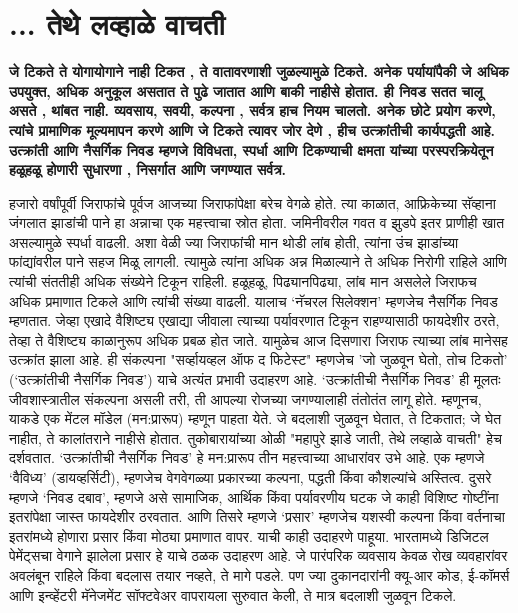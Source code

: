 \chapter{... तेथे लव्हाळे वाचती}

\textcolor{blue!60!black}{\textbf{जे टिकते ते योगायोगाने नाही टिकत , ते वातावरणाशी जुळल्यामुळे टिकते. अनेक पर्यायांपैकी जे अधिक उपयुक्त, अधिक अनुकूल असतात ते पुढे जातात आणि बाकी नाहीसे होतात. ही निवड सतत चालू असते , थांबत नाही. व्यवसाय, सवयी, कल्पना , सर्वत्र हाच नियम चालतो. अनेक छोटे प्रयोग करणे, त्यांचे प्रामाणिक मूल्यमापन करणे आणि जे टिकते त्यावर जोर देणे , हीच उत्क्रांतीची कार्यपद्धती आहे. उत्क्रांती आणि नैसर्गिक निवड म्हणजे विविधता, स्पर्धा आणि टिकण्याची क्षमता यांच्या परस्परक्रियेतून हळूहळू होणारी सुधारणा , निसर्गात आणि जगण्यात सर्वत्र.}}

हजारो वर्षांपूर्वी जिराफांचे पूर्वज आजच्या जिराफांपेक्षा बरेच वेगळे होते. त्या काळात, आफ्रिकेच्या सॅव्हाना जंगलात झाडांची पाने हा अन्नाचा एक महत्त्वाचा स्रोत होता. जमिनीवरील गवत व झुडपे इतर प्राणीही खात असल्यामुळे स्पर्धा वाढली. अशा वेळी ज्या जिराफांची मान थोडी लांब होती, त्यांना उंच झाडांच्या फांद्यांवरील पाने सहज मिळू लागली. त्यामुळे त्यांना अधिक अन्न मिळाल्याने ते अधिक निरोगी राहिले आणि त्यांची संततीही अधिक संख्येने टिकून राहिली. हळूहळू, पिढ्यानपिढ्या, लांब मान असलेले जिराफच अधिक प्रमाणात टिकले आणि त्यांची संख्या वाढली. यालाच ‘नॅचरल सिलेक्शन’ म्हणजेच नैसर्गिक निवड म्हणतात. जेव्हा एखादे वैशिष्ट्य एखाद्या जीवाला त्याच्या पर्यावरणात टिकून राहण्यासाठी फायदेशीर ठरते, तेव्हा ते वैशिष्ट्य काळानुरूप अधिक प्रबळ होत जाते. यामुळेच आज दिसणारा जिराफ त्याच्या लांब मानेसह उत्क्रांत झाला आहे. ही संकल्पना "सर्व्हायव्हल ऑफ द फिटेस्ट" म्हणजेच 'जो जुळवून घेतो, तोच टिकतो' (‘उत्क्रांतीची नैसर्गिक निवड’) याचे अत्यंत प्रभावी उदाहरण आहे.
‘उत्क्रांतीची नैसर्गिक निवड’ ही मूलतः जीवशास्त्रातील संकल्पना असली तरी, ती आपल्या रोजच्या जगण्यालाही तंतोतंत लागू होते. म्हणूनच, याकडे एक मेंटल मॉडेल (मन:प्रारूप) म्हणून पाहता येते. जे बदलाशी जुळवून घेतात, ते टिकतात; जे घेत नाहीत, ते कालांतराने नाहीसे होतात. तुकोबारायांच्या ओळी "महापुरे झाडे जाती, तेथे लव्हाळे वाचती" हेच दर्शवतात. ‘उत्क्रांतीची  नैसर्गिक निवड’ हे मन:प्रारूप तीन महत्त्वाच्या आधारांवर उभे आहे. एक म्हणजे ‘वैविध्य’ (डायव्हर्सिटी), म्हणजेच वेगवेगळ्या प्रकारच्या कल्पना, पद्धती किंवा कौशल्यांचे अस्तित्व. दुसरे म्हणजे ‘निवड दबाव’, म्हणजे असे सामाजिक, आर्थिक किंवा पर्यावरणीय घटक जे काही विशिष्ट गोष्टींना इतरांपेक्षा जास्त फायदेशीर ठरवतात. आणि तिसरे म्हणजे ‘प्रसार’ म्हणजेच यशस्वी कल्पना किंवा वर्तनाचा इतरांमध्ये होणारा प्रसार किंवा मोठ्या प्रमाणात वापर. याची काही उदाहरणे पाहूया.
भारतामध्ये डिजिटल पेमेंट्सचा वेगाने झालेला प्रसार हे याचे ठळक उदाहरण आहे. जे पारंपरिक व्यवसाय केवळ रोख व्यवहारांवर अवलंबून राहिले किंवा बदलास तयार नव्हते, ते मागे पडले. पण ज्या दुकानदारांनी क्यू-आर कोड, ई-कॉमर्स आणि इन्व्हेंटरी मॅनेजमेंट सॉफ्टवेअर वापरायला सुरुवात केली, ते मात्र बदलाशी जुळवून टिकले.
